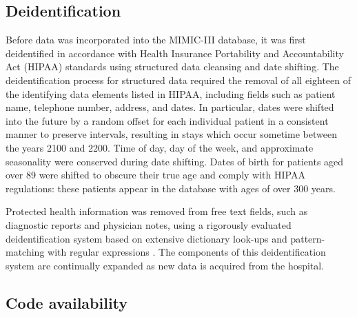 \documentclass[english]{article}
\begin{document}
\subsection*{Deidentification}

Before data was incorporated into the MIMIC-III database, it was first deidentified in accordance with Health Insurance Portability and Accountability Act (HIPAA) standards using structured data cleansing and date shifting. The deidentification process for structured data required the removal of all eighteen of the identifying data elements listed in HIPAA, including fields such as patient name, telephone number, address, and dates. In particular, dates were shifted into the future by a random offset for each individual patient in a consistent manner to preserve intervals, resulting in stays which occur sometime between the years 2100 and 2200. Time of day, day of the week, and approximate seasonality were conserved during date shifting. Dates of birth for patients aged over 89 were shifted to obscure their true age and comply with HIPAA regulations: these patients appear in the database with ages of over 300 years. 

Protected health information was removed from free text fields, such as diagnostic reports and physician notes, using a rigorously evaluated deidentification system based on extensive dictionary look-ups and pattern-matching with regular expressions \cite{cite5}. The components of this deidentification system are continually expanded as new data is acquired from the hospital.

\subsection*{Code availability}


\end{document}
